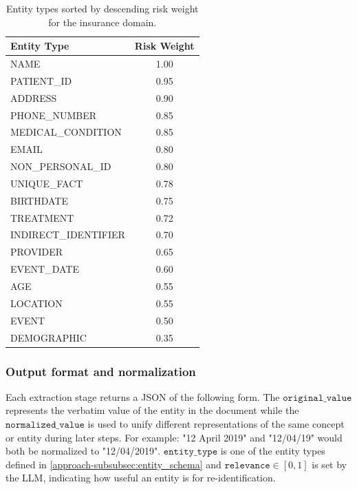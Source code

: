 \begin{table}[h!] 
    \centering
    \begin{tabular}{lc}
        \toprule
        \textbf{Entity Type} & \textbf{Risk Weight} \\
        \midrule
        NAME                 & 1.00 \\
        PATIENT\_ID          & 0.95 \\
        ADDRESS              & 0.90 \\
        PHONE\_NUMBER        & 0.85 \\
        MEDICAL\_CONDITION   & 0.85 \\
        EMAIL                & 0.80 \\
        NON\_PERSONAL\_ID    & 0.80 \\
        UNIQUE\_FACT         & 0.78 \\
        BIRTHDATE            & 0.75 \\
        TREATMENT            & 0.72 \\
        INDIRECT\_IDENTIFIER & 0.70 \\
        PROVIDER             & 0.65 \\
        EVENT\_DATE          & 0.60 \\
        AGE                  & 0.55 \\
        LOCATION             & 0.55 \\
        EVENT                & 0.50 \\
        DEMOGRAPHIC          & 0.35 \\
        \bottomrule
    \end{tabular}
    \caption{Entity types sorted by descending risk weight for the insurance domain.}
    \label{approach-tab:entity-weight-schema}
\end{table}

\subsubsection{Output format and normalization}
Each extraction stage returns a JSON of the following form. The $\texttt{original\_value}$ represents the verbatim value of the entity in the document while the $\texttt{normalized\_value}$ is used to unify different representations of the same concept or entity during later steps. For example: "12 April 2019" and "12/04/19" would both be normalized to "12/04/2019". $\texttt{entity\_type}$ is one of the entity types defined in \ref{approach-subsubsec:entity_schema} and $\texttt{relevance}\in[0,1]$ is set by the LLM, indicating how useful an entity is for re-identification.

